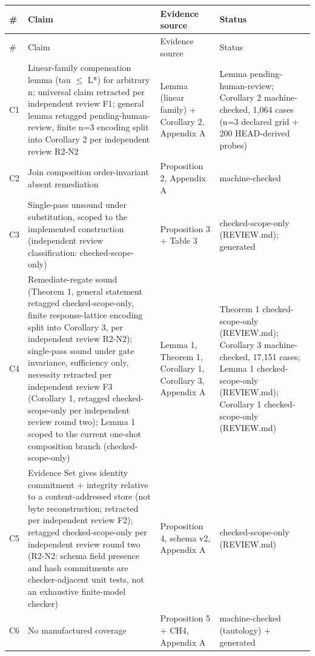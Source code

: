 \documentclass[11pt,a4paper]{article}
\theoremstyle{definition}
\begin{document}
\small
\begin{longtable}{>{\raggedright\arraybackslash}p{}>{\raggedright\arraybackslash}p{}>{\raggedright\arraybackslash}p{}>{\raggedright\arraybackslash}p{}}
\toprule
\# & Claim & Evidence source & Status \\
\midrule
\endfirsthead
\toprule
\# & Claim & Evidence source & Status \\
\midrule
\endhead
\bottomrule
\endfoot
C1 & Linear-family compensation lemma (tau $\leq$ L*) for arbitrary n; universal claim retracted per independent review F1; general lemma retagged pending-human-review, finite n=3 encoding split into Corollary 2 per independent review R2-N2 & Lemma (linear family) + Corollary 2, Appendix A & Lemma pending-human-review; Corollary 2 machine-checked, 1,064 cases (n=3 declared grid + 200 HEAD-derived probes) \\
C2 & Join composition order-invariant absent remediation & Proposition 2, Appendix A & machine-checked \\
C3 & Single-pass unsound under substitution, scoped to the implemented construction (independent review classification: checked-scope-only) & Proposition 3 + Table 3 & checked-scope-only (REVIEW.md); generated \\
C4 & Remediate-regate sound (Theorem 1, general statement retagged checked-scope-only, finite response-lattice encoding split into Corollary 3, per independent review R2-N2); single-pass sound under gate invariance, sufficiency only, necessity retracted per independent review F3 (Corollary 1, retagged checked-scope-only per independent review round two); Lemma 1 scoped to the current one-shot composition branch (checked-scope-only) & Lemma 1, Theorem 1, Corollary 1, Corollary 3, Appendix A & Theorem 1 checked-scope-only (REVIEW.md); Corollary 3 machine-checked, 17,151 cases; Lemma 1 checked-scope-only (REVIEW.md); Corollary 1 checked-scope-only (REVIEW.md) \\
C5 & Evidence Set gives identity commitment + integrity relative to a content-addressed store (not byte reconstruction; retracted per independent review F2); retagged checked-scope-only per independent review round two (R2-N2: schema field presence and hash commitments are checker-adjacent unit tests, not an exhaustive finite-model checker) & Proposition 4, schema v2, Appendix A & checked-scope-only (REVIEW.md) \\
C6 & No manufactured coverage & Proposition 5 + CH4, Appendix A & machine-checked (tautology) + generated \\

\end{longtable}
\end{document}
